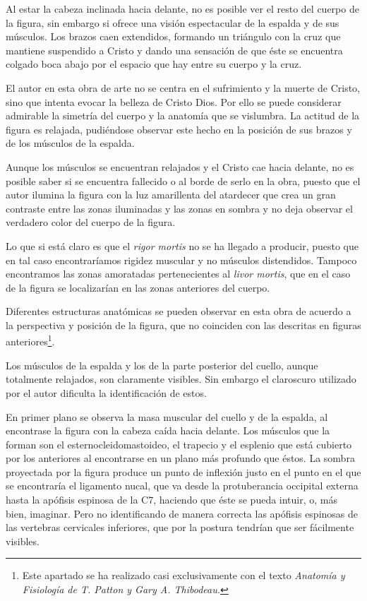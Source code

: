 Al estar la cabeza inclinada hacia delante, no es posible ver el resto del cuerpo de la figura, sin embargo si ofrece una visión espectacular de la espalda y de sus músculos. Los brazos caen extendidos, formando un triángulo con la cruz que mantiene suspendido a Cristo y dando una sensación de que éste se encuentra colgado boca abajo por el espacio que hay entre su cuerpo y la cruz.

El autor en esta obra de arte no se centra en el sufrimiento y la muerte de Cristo, sino que intenta evocar la belleza de Cristo Dios. Por ello se puede considerar admirable la simetría del cuerpo y la anatomía que se vislumbra. La actitud de la figura es relajada, pudiéndose observar este hecho en la posición de sus brazos y de los músculos de la espalda.

Aunque los músculos se encuentran relajados y el Cristo cae hacia delante, no es posible saber si se encuentra fallecido o al borde de serlo en la obra, puesto que el autor ilumina la figura con la luz amarillenta del atardecer que crea un gran contraste entre las zonas iluminadas y las zonas en sombra y no deja observar el verdadero color del cuerpo de la figura.

Lo que si está claro es que el \textit{rigor mortis} no se ha llegado a producir, puesto que en tal caso encontraríamos rigidez muscular y no músculos distendidos. Tampoco encontramos las zonas amoratadas pertenecientes al \textit{livor mortis}, que en el caso de la figura se localizarían en las zonas anteriores del cuerpo.

Diferentes estructuras anatómicas se pueden observar en esta obra de acuerdo a la perspectiva y posición de la figura, que no coinciden con las descritas en figuras anteriores\footnote{Este apartado se ha realizado casi exclusivamente con el texto \textit{Anatomía y Fisiología de T. Patton y Gary A. Thibodeau.}\cite{RefWorks:63}}.

Los músculos de la espalda y los de la parte posterior del cuello, aunque totalmente relajados, son claramente visibles. Sin embargo el claroscuro utilizado por el autor dificulta la identificación de estos.


En primer plano se observa la masa muscular del cuello y de la espalda, al encontrase la figura con la cabeza caída hacia delante. Los músculos que la forman son el esternocleidomastoideo, el trapecio y el esplenio que está cubierto por los anteriores al encontrarse en un plano más profundo que éstos. La sombra proyectada por la figura produce un punto de inflexión justo en el punto en el que se encontraría el ligamento nucal, que va desde la protuberancia occipital externa hasta la apófisis espinosa de la C7, haciendo que éste se pueda intuir, o, más bien, imaginar. Pero no identificando de manera correcta las apófisis espinosas de las vertebras cervicales inferiores, que por la postura tendrían que ser fácilmente visibles. 

